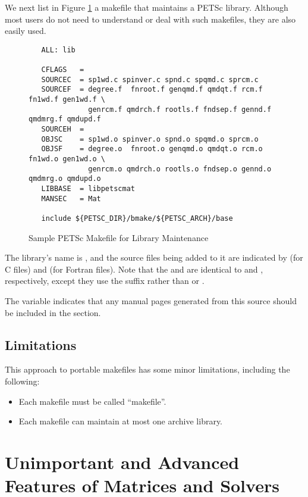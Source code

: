 We next list in Figure \ref{fig:make3} a makefile that maintains a PETSc 
library.  Although most users do not need to understand or deal with such
makefiles, they are also easily used.

\begin{figure}[H]
{\small
\begin{verbatim}
   ALL: lib

   CFLAGS   =  
   SOURCEC  = sp1wd.c spinver.c spnd.c spqmd.c sprcm.c
   SOURCEF  = degree.f  fnroot.f genqmd.f qmdqt.f rcm.f fn1wd.f gen1wd.f \
              genrcm.f qmdrch.f rootls.f fndsep.f gennd.f qmdmrg.f qmdupd.f
   SOURCEH  = 
   OBJSC    = sp1wd.o spinver.o spnd.o spqmd.o sprcm.o
   OBJSF    = degree.o  fnroot.o genqmd.o qmdqt.o rcm.o fn1wd.o gen1wd.o \
              genrcm.o qmdrch.o rootls.o fndsep.o gennd.o qmdmrg.o qmdupd.o
   LIBBASE  = libpetscmat
   MANSEC   = Mat

   include ${PETSC_DIR}/bmake/${PETSC_ARCH}/base
\end{verbatim}
}
\caption{Sample PETSc Makefile for Library Maintenance}
\label{fig:make3}
\end{figure}

The library's name is , and the source files being added
to it are indicated by  (for C files) and  (for 
Fortran files). Note that the \trl{OBJSF} and \trl{OBJSC} are identical 
to \trl{SOURCEF} and \trl{SOURCEC}, respectively, except they use the
suffix \trl{.o} rather than \trl{.c} or \trl{.f}. 

The variable  indicates that any manual pages generated
from this source should be included in the  section. 

\section{Limitations}

This approach to portable makefiles has some minor limitations, including
the following:
\begin{itemize}
\item Each makefile must be called ``makefile''.
\item Each makefile can maintain at most one archive library.
\end{itemize}



\chapter{Unimportant and Advanced Features of Matrices and Solvers}
\label{ch:advanced}

